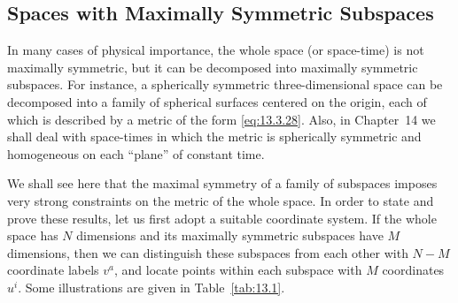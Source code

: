 
\subsection{Spaces with Maximally Symmetric Subspaces}\label{sec:13.5}

In many cases of physical importance, the whole space (or space-time) is not
maximally symmetric, but it can be decomposed into maximally symmetric
subspaces. For instance, a spherically symmetric three-dimensional space can
be decomposed into a family of spherical surfaces centered on the origin,
each of which is described by a metric of the form \eqref{eq:13.3.28}. Also,
in Chapter~14 we shall deal with space-times in which the metric is
spherically symmetric and homogeneous on each ``plane'' of constant time.

We shall see here that the maximal symmetry of a family of subspaces imposes
very strong constraints on the metric of the whole space. In order to state
and prove these results, let us first adopt a suitable coordinate system. If
the whole space has \(N\) dimensions and its maximally symmetric subspaces
have \(M\) dimensions, then we can distinguish these subspaces from each
other with \(N-M\) coordinate labels \(v^a\), and locate points within each
subspace with \(M\) coordinates \(u^i\). Some illustrations are given in
Table~\ref{tab:13.1}.

